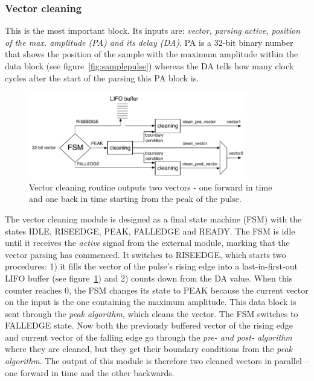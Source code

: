  
\subsubsection{Vector cleaning}
This is the most important block. Its inputs are: \emph{vector, parsing active, position of the max. amplitude (PA) and its delay (DA)}. PA is a 32-bit binary number that shows the position of the sample with the maximum amplitude within the data block (see figure~\ref{fig:samplepulse}) whereas the DA tells how many clock cycles after the start of the parsing this PA block is.
\begin{figure}[!t]
\centering
\includegraphics[width=0.85\textwidth]{05_current_monitoring/plots/vector_clean}
\caption{Vector cleaning routine outputs two vectors - one forward in time and one back in time starting from the peak of the pulse.}
\label{fig:routine}
\end{figure}
The vector cleaning module is designed as a final state machine (FSM) with the states IDLE, RISEEDGE, PEAK, FALLEDGE and READY.  The FSM is idle until it receives the \emph{active} signal from the external module, marking that the vector parsing has commenced. It switches to RISEEDGE, which starts two procedures: 1) it fills the vector of the pulse's rising edge into a last-in-first-out LIFO buffer (see figure~\ref{fig:routine}) and 2) counts down from the DA value. When this counter reaches 0, the FSM changes its state to PEAK because the current vector on the input is the one containing the maximum amplitude. This data block is sent through the \emph{peak algorithm}, which cleans the vector. The FSM switches to FALLEDGE state. Now both the previously buffered vector of the rising edge and current vector of the falling edge go through the \emph{pre- and post- algorithm} where they are cleaned, but they get their boundary conditions from the \emph{peak algorithm}. The output of this module is therefore two cleaned vectors in parallel -- one forward in time and the other backwards.



